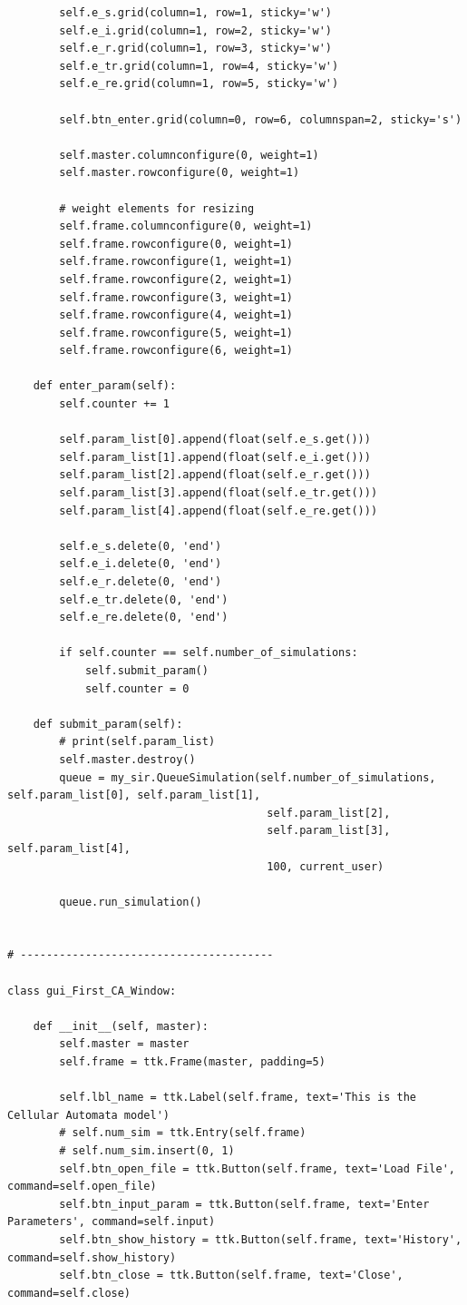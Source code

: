 \documentclass[11pt, a4paper]{article}
\begin{document}
\begin{lstlisting}
        self.e_s.grid(column=1, row=1, sticky='w')
        self.e_i.grid(column=1, row=2, sticky='w')
        self.e_r.grid(column=1, row=3, sticky='w')
        self.e_tr.grid(column=1, row=4, sticky='w')
        self.e_re.grid(column=1, row=5, sticky='w')

        self.btn_enter.grid(column=0, row=6, columnspan=2, sticky='s')

        self.master.columnconfigure(0, weight=1)
        self.master.rowconfigure(0, weight=1)

        # weight elements for resizing
        self.frame.columnconfigure(0, weight=1)
        self.frame.rowconfigure(0, weight=1)
        self.frame.rowconfigure(1, weight=1)
        self.frame.rowconfigure(2, weight=1)
        self.frame.rowconfigure(3, weight=1)
        self.frame.rowconfigure(4, weight=1)
        self.frame.rowconfigure(5, weight=1)
        self.frame.rowconfigure(6, weight=1)

    def enter_param(self):
        self.counter += 1

        self.param_list[0].append(float(self.e_s.get()))
        self.param_list[1].append(float(self.e_i.get()))
        self.param_list[2].append(float(self.e_r.get()))
        self.param_list[3].append(float(self.e_tr.get()))
        self.param_list[4].append(float(self.e_re.get()))

        self.e_s.delete(0, 'end')
        self.e_i.delete(0, 'end')
        self.e_r.delete(0, 'end')
        self.e_tr.delete(0, 'end')
        self.e_re.delete(0, 'end')

        if self.counter == self.number_of_simulations:
            self.submit_param()
            self.counter = 0

    def submit_param(self):
        # print(self.param_list)
        self.master.destroy()
        queue = my_sir.QueueSimulation(self.number_of_simulations, self.param_list[0], self.param_list[1],
                                        self.param_list[2],
                                        self.param_list[3], self.param_list[4],
                                        100, current_user)

        queue.run_simulation()


# ---------------------------------------

class gui_First_CA_Window:

    def __init__(self, master):
        self.master = master
        self.frame = ttk.Frame(master, padding=5)

        self.lbl_name = ttk.Label(self.frame, text='This is the Cellular Automata model')
        # self.num_sim = ttk.Entry(self.frame)
        # self.num_sim.insert(0, 1)
        self.btn_open_file = ttk.Button(self.frame, text='Load File', command=self.open_file)
        self.btn_input_param = ttk.Button(self.frame, text='Enter Parameters', command=self.input)
        self.btn_show_history = ttk.Button(self.frame, text='History', command=self.show_history)
        self.btn_close = ttk.Button(self.frame, text='Close', command=self.close)


\end{lstlisting}
\end{document}
